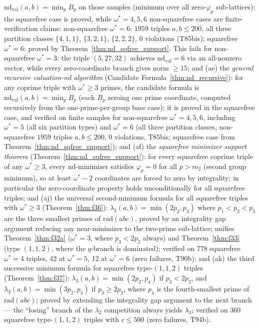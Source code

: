 \documentclass[12pt]{article}
\theoremstyle{definition}
\begin{document}
$\mathrm{nd}_{\mathrm{val}}(a,b) = \min_p B_p$ on those samples
(minimum over all zero-$\varphi_p$ sub-lattices); the squarefree case is proved,
while $\omega^*=4,5,6$ non-squarefree cases are finite-verification claims:
non-squarefree $\omega^*=6$: $1959$ triples $a,b\le 200$, all three
partition classes $\{4,1,1\}$, $\{3,2,1\}$, $\{2,2,2\}$, $0$ violations
(T85bis); squarefree $\omega^*=6$: proved by Theorem~\ref{thm:nd_sqfree_support}.
This fails for non-squarefree $\omega^*=3$: the triple $(5,27,32)$ achieves
$\mathrm{nd}_{\mathrm{val}}=6$ via an all-nonzero vector, while every zero-coordinate branch
gives norm $\ge 15$;
and (ae) the \emph{general recursive valuation-nd algorithm}
(Candidate Formula~\ref{thm:nd_recursive}): for any coprime triple with $\omega^*\ge 3$
primes, the candidate formula is
$\mathrm{nd}_{\mathrm{val}}(a,b) = \min_p B_p$ (each $B_p$ zeroing one prime coordinate,
computed recursively from the one-prime-per-group base case); it is proved in the squarefree case,
and verified on finite samples for non-squarefree $\omega^*=4,5,6$, including
$\omega^*=5$ (all six partition types) and $\omega^*=6$ (all
three partition classes, non-squarefree $1959$ triples $a,b\le 200$,
$0$ violations, T85bis; squarefree case from Theorem~\ref{thm:nd_sqfree_support});
and (af) the \emph{squarefree minimizer support theorem}
(Theorem~\ref{thm:nd_sqfree_support}): for every squarefree coprime triple
of any $\omega^*\ge 3$, every nd-minimizer satisfies $\varphi_p=0$ for all
$p > m_2$ (second group minimum), so at least $\omega^*-2$ coordinates are
forced to zero by integrality; in particular the zero-coordinate property
holds unconditionally for all squarefree triples;
and (aj) the universal second-minimum formula for all squarefree triples with
$\omega^* \ge 3$ (Theorem~\ref{thm:f36}): $\lambda_2(a,b) = \min(2p_2, p_3)$
where $p_1 < p_2 < p_3$ are the three smallest primes of $\mathrm{rad}(abc)$,
proved by an integrality gap argument reducing any near-minimizer to the
two-prime sub-lattice; unifies Theorem~\ref{thm:f32a} ($\omega^*=3$, where
$p_3 < 2p_2$ always) and Theorem~\ref{thm:f33} (type $(1,1,2)$, where the
$q$-branch is dominated); verified on 778 squarefree $\omega^*=4$ triples,
42 at $\omega^*=5$, 12 at $\omega^*=6$ (zero failures, T90b);
and (ak) the third successive minimum formula for squarefree type-$(1,1,2)$
triples (Theorem~\ref{thm:f37}):
$\lambda_3(a,b) = \min(2p_2, p_4)$ if $p_3 < 2p_2$, and
$\lambda_3(a,b) = \min(3p_2, p_3)$ if $p_3 \ge 2p_2$, where $p_4$ is the
fourth-smallest prime of $\mathrm{rad}(abc)$;
proved by extending the integrality gap argument to the next branch --- the
``losing'' branch of the $\lambda_2$ competition always yields $\lambda_3$;
verified on $360$ squarefree type-$(1,1,2)$ triples with $c \le 500$ (zero failures, T94b).
\end{document}

